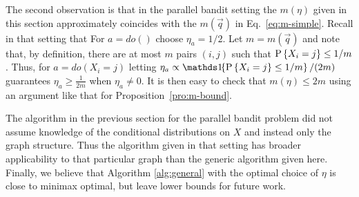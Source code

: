 The second observation is that in the parallel bandit setting the $m(\eta)$ given in this section approximately coincides with the $m(\vec{q})$ in Eq.\ \ref{eq:m-simple}.
Recall in that setting that 
For $a = do()$ choose $\eta_a = 1/2$. 
Let $m = m(\vec{q})$ and note that, by definition, there are at most $m$ pairs $(i,j)$ such that $\P{X_i = j} \leq 1/m$.
Thus, for $a = do(X_i = j)$ letting $\eta_a \propto \ind{\P{X_i = j} \leq 1/m} / (2m)$ guarantees $\eta_a \ge \frac{1}{2m}$ when $\eta_a \ne 0$.
It is then easy to check that $m(\eta) \leq 2m$ using an argument like that for Proposition~\ref{pro:m-bound}.

\begin{remark}
The algorithm in the previous section for the parallel bandit problem did not assume knowledge of the conditional distributions on $X$ and 
instead only the graph structure. Thus the algorithm given in that setting has broader applicability to that particular graph than the generic algorithm given here.
Finally, we believe that Algorithm \ref{alg:general} with the optimal choice of $\eta$ is close to minimax optimal, but leave lower bounds
for future work.
\end{remark}




